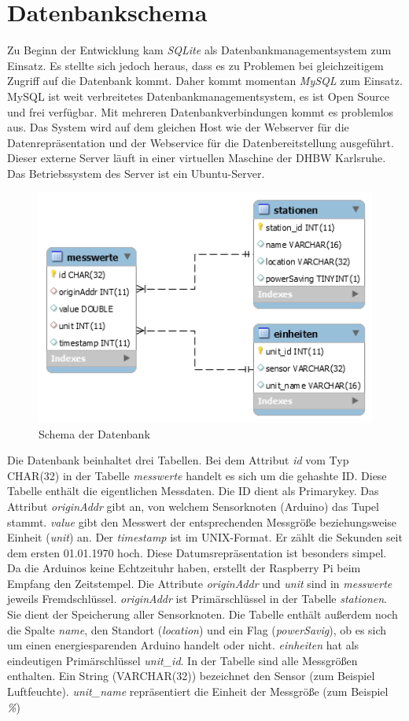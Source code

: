 \section{Datenbankschema}
\label{sec:db}
Zu Beginn der Entwicklung kam \textit{SQLite} als Datenbankmanagementsystem zum Einsatz. Es stellte sich jedoch heraus, dass es zu Problemen bei gleichzeitigem Zugriff auf die Datenbank kommt. Daher kommt momentan \textit{MySQL} zum Einsatz. MySQL ist weit verbreitetes Datenbankmanagementsystem, es ist Open Source und frei verfügbar. Mit mehreren Datenbankverbindungen kommt es problemlos aus. Das System wird auf dem gleichen Host wie der Webserver für die Datenrepräsentation und der Webservice für die Datenbereitstellung ausgeführt. Dieser externe Server läuft in einer virtuellen Maschine der DHBW Karlsruhe. Das Betriebssystem des Server ist ein Ubuntu-Server. 
\begin{figure}[h!]
\includegraphics[scale=0.8]{bilder/EERDiagramm} 
\caption{Schema der Datenbank}
\label{Datenbankschema}
\end{figure}   
Die Datenbank beinhaltet drei Tabellen. Bei dem Attribut \textit{id} vom Typ CHAR(32) in der Tabelle \textit{messwerte} handelt es sich um die gehashte ID. Diese Tabelle enthält die eigentlichen Messdaten. Die ID dient als Primarykey. Das Attribut \textit{originAddr} gibt an, von welchem Sensorknoten (Arduino) das Tupel stammt. \textit{value} gibt den Messwert der entsprechenden Messgröße beziehungsweise Einheit (\textit{unit}) an. Der \textit{timestamp} ist im UNIX-Format. Er zählt die Sekunden seit dem ersten 01.01.1970 hoch. Diese Datumsrepräsentation ist besonders simpel. Da die Arduinos keine Echtzeituhr haben, erstellt der Raspberry Pi beim Empfang den Zeitstempel.
Die Attribute \textit{originAddr} und \textit{unit} sind in \textit{messwerte} jeweils Fremdschlüssel. \textit{originAddr} ist Primärschlüssel in der Tabelle \textit{stationen}. Sie dient der Speicherung aller Sensorknoten. Die Tabelle enthält außerdem noch die Spalte \textit{name}, den Standort (\textit{location}) und ein Flag (\textit{powerSavig}), ob es sich um einen energiesparenden Arduino handelt oder nicht.
\textit{einheiten} hat als eindeutigen Primärschlüssel \textit{unit\_id}. In der Tabelle sind alle Messgrößen enthalten. Ein String (VARCHAR(32)) bezeichnet den Sensor (zum Beispiel Luftfeuchte). \textit{unit\_name} repräsentiert die Einheit der Messgröße (zum Beispiel \textit{\%}) 
